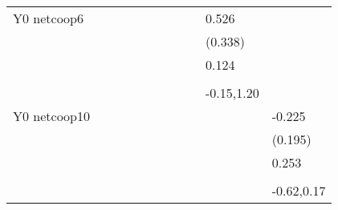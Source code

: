 \begin{table}[!h]
\begin{adjustbox}{width=\columnwidth,center}
\begin{tabular}{l*{8}{c}}
Y0 netcoop6         &                     &                     &                     &                     &                     &                     &                     &                     &       0.526         &                     \\
                    &                     &                     &                     &                     &                     &                     &                     &                     &     (0.338)         &                     \\
                    &                     &                     &                     &                     &                     &                     &                     &                     &       0.124         &                     \\
                    &                     &                     &                     &                     &                     &                     &                     &                     &                     &                     \\
                    &                     &                     &                     &                     &                     &                     &                     &                     &  -0.15,1.20         &                     \\
Y0 netcoop10        &                     &                     &                     &                     &                     &                     &                     &                     &                     &      -0.225         \\
                    &                     &                     &                     &                     &                     &                     &                     &                     &                     &     (0.195)         \\
                    &                     &                     &                     &                     &                     &                     &                     &                     &                     &       0.253         \\
                    &                     &                     &                     &                     &                     &                     &                     &                     &                     &                     \\
                    &                     &                     &                     &                     &                     &                     &                     &                     &                     &  -0.62,0.17         \\

\end{tabular}
\end{adjustbox}
\end{table}
